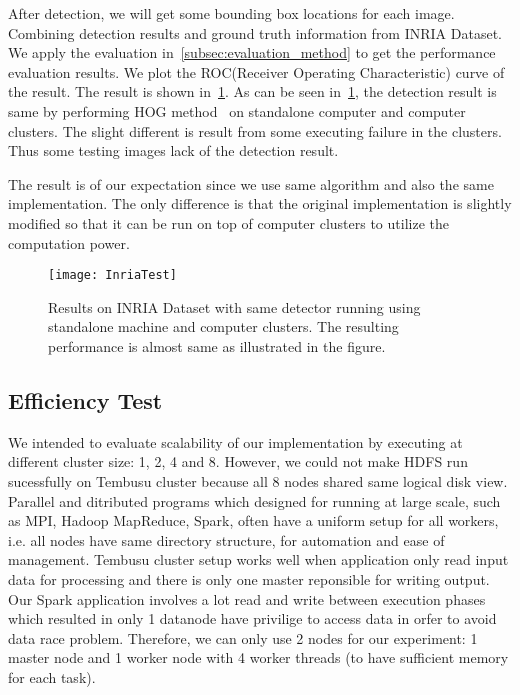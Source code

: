 After detection, we will get some bounding box locations for each image.
Combining detection results and ground truth information from INRIA Dataset.
We apply the evaluation in~\ref{subsec:evaluation_method} to get the
performance evaluation results. We plot the ROC(Receiver Operating
Characteristic) curve of the result.
The result is shown in~\fig\ref{fig:inria_roc}. As can be seen
in~\fig\ref{fig:inria_roc}, the detection result is same by performing HOG
method~\cite{2005_CVPR_Dalal} on standalone computer and computer clusters. The
slight different is result from some executing failure in the clusters. Thus
some testing images lack of the detection result. 

The result is of our expectation since we use same algorithm and also the same
implementation. The only difference is that the original implementation is
slightly modified so that it can be run on top of computer clusters to utilize
the computation power. 


\begin{figure}[!htbp]
  \centering
  \begin{minipage}{1.0\columnwidth}
  \texttt{[image: InriaTest]}
  \end{minipage}
  
  \vspace{-1ex}
  \caption
    {
    \small
	Results on INRIA Dataset with same detector running using standalone machine
	and computer clusters. The resulting performance is almost same as illustrated
	in the figure. }
  \label{fig:inria_roc}
\end{figure}

\subsection{Efficiency Test}
We intended to evaluate scalability of our implementation by executing at
different cluster size: 1, 2, 4 and 8. However, we could not make HDFS run
sucessfully on Tembusu cluster because all 8 nodes shared same logical disk
view. Parallel and ditributed programs which designed for running at large
scale, such as MPI, Hadoop MapReduce, Spark, often have a uniform setup for all
workers, i.e. all nodes have same directory structure, for automation and
ease of management. Tembusu cluster setup works well when application only read
input data for processing and there is only one master reponsible for writing
output. Our Spark application involves a lot read and write between
execution phases which resulted in only 1 datanode have privilige to access data
in orfer to avoid data race problem. Therefore, we can only use 2 nodes for our
experiment: 1 master node and 1 worker node with 4 worker threads (to have
sufficient memory for each task).

